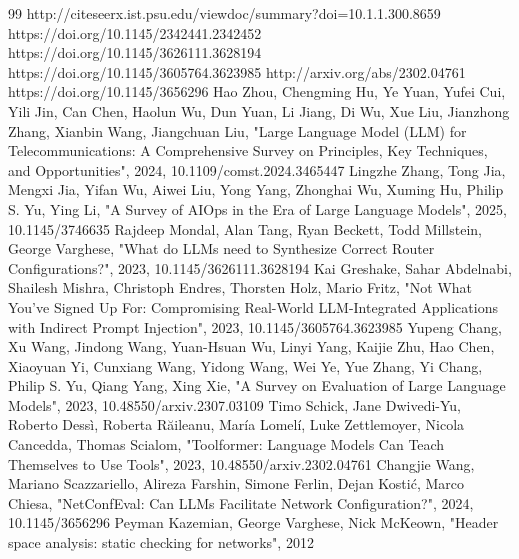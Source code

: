 \documentclass[conference]{IEEEtran}
\begin{document}
\begin{thebibliography}{99}
 http://citeseerx.ist.psu.edu/viewdoc/summary?doi=10.1.1.300.8659
 https://doi.org/10.1145/2342441.2342452
 https://doi.org/10.1145/3626111.3628194
 https://doi.org/10.1145/3605764.3623985
 http://arxiv.org/abs/2302.04761
 https://doi.org/10.1145/3656296
 Hao Zhou, Chengming Hu, Ye Yuan, Yufei Cui, Yili Jin, Can Chen, Haolun Wu, Dun Yuan, Li Jiang, Di Wu, Xue Liu, Jianzhong Zhang, Xianbin Wang, Jiangchuan Liu, "Large Language Model (LLM) for Telecommunications: A Comprehensive Survey on Principles, Key Techniques, and Opportunities", 2024, 10.1109/comst.2024.3465447
 Lingzhe Zhang, Tong Jia, Mengxi Jia, Yifan Wu, Aiwei Liu, Yong Yang, Zhonghai Wu, Xuming Hu, Philip S. Yu, Ying Li, "A Survey of AIOps in the Era of Large Language Models", 2025, 10.1145/3746635
 Rajdeep Mondal, Alan Tang, Ryan Beckett, Todd Millstein, George Varghese, "What do LLMs need to Synthesize Correct Router Configurations?", 2023, 10.1145/3626111.3628194
 Kai Greshake, Sahar Abdelnabi, Shailesh Mishra, Christoph Endres, Thorsten Holz, Mario Fritz, "Not What You've Signed Up For: Compromising Real-World LLM-Integrated Applications with Indirect Prompt Injection", 2023, 10.1145/3605764.3623985
 Yupeng Chang, Xu Wang, Jindong Wang, Yuan-Hsuan Wu, Linyi Yang, Kaijie Zhu, Hao Chen, Xiaoyuan Yi, Cunxiang Wang, Yidong Wang, Wei Ye, Yue Zhang, Yi Chang, Philip S. Yu, Qiang Yang, Xing Xie, "A Survey on Evaluation of Large Language Models", 2023, 10.48550/arxiv.2307.03109
 Timo Schick, Jane Dwivedi-Yu, Roberto Dessì, Roberta Răileanu, María Lomelí, Luke Zettlemoyer, Nicola Cancedda, Thomas Scialom, "Toolformer: Language Models Can Teach Themselves to Use Tools", 2023, 10.48550/arxiv.2302.04761
 Changjie Wang, Mariano Scazzariello, Alireza Farshin, Simone Ferlin, Dejan Kostić, Marco Chiesa, "NetConfEval: Can LLMs Facilitate Network Configuration?", 2024, 10.1145/3656296
 Peyman Kazemian, George Varghese, Nick McKeown, "Header space analysis: static checking for networks", 2012
\end{thebibliography}
\end{document}
